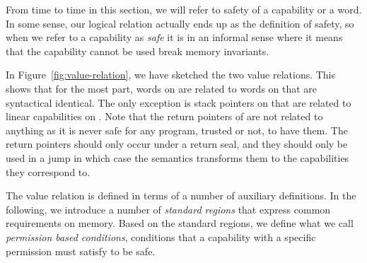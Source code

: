 \begin{jversion}
From time to time in this section, we will refer to safety of a capability or a word.
In some sense, our logical relation actually ends up as the definition of safety, so when we refer to a capability as \emph{safe} it is in an informal sense where it means that the capability cannot be used break memory invariants. 

In Figure~\ref{fig:value-relation}, we have sketched the two value relations.
This shows that for the most part, words on \srccm{} are related to words on \trgcm{} that are syntactical identical.
The only exception is stack pointers on \srccm{} that are related to linear capabilities on \trgcm{}.
Note that the return pointers of \srccm{} are not related to anything as it is never safe for any program, trusted or not, to have them.
The \srccm{} return pointers should only occur under a return seal, and they should only be used in a jump in which case the \srccm{} semantics transforms them to the capabilities they correspond to.

The value relation is defined in terms of a number of auxiliary definitions.
In the following, we introduce a number of \emph{standard regions} that express common requirements on memory. Based on the standard regions, we define what we call \emph{permission based conditions}, conditions that a capability with a specific permission must satisfy to be safe.





\end{jversion}
